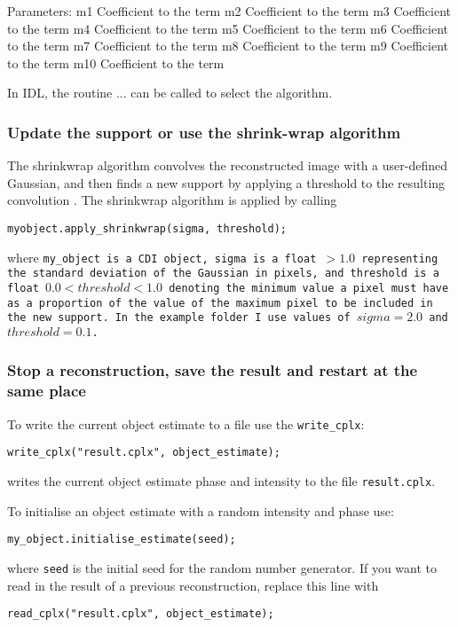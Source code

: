 \documentclass[]{nadia}
\begin{document}
Parameters:
m1 	Coefficient to the  term
m2 	Coefficient to the  term
m3 	Coefficient to the  term
m4 	Coefficient to the  term
m5 	Coefficient to the  term
m6 	Coefficient to the  term
m7 	Coefficient to the  term
m8 	Coefficient to the  term
m9 	Coefficient to the  term
m10 	Coefficient to the  term




In IDL, the routine ... can be called to select the algorithm.


\subsubsection{Update the support or use the shrink-wrap algorithm}

The shrinkwrap algorithm convolves the reconstructed image with a user-defined Gaussian, and then finds a new support by applying a threshold to the resulting convolution \cite{marchesini:03}. The shrinkwrap algorithm is applied by  calling

\begin{verbatim}
myobject.apply_shrinkwrap(sigma, threshold);
\end{verbatim}

where \tt{my\_object} is a CDI object, {\tt sigma} is a float $>1.0$ representing the standard deviation of the Gaussian in pixels, and {\tt threshold} is a float $0.0<threshold<1.0$ denoting the minimum value a pixel must have as a proportion of the value of the maximum pixel to be included in the new support. In the example folder I use values of $sigma = 2.0$ and $threshold = 0.1$. 

\subsubsection{Stop a reconstruction, save the result and restart at the same place}

To write the current object estimate to a file use the {\tt write{\_}cplx}:

\begin{verbatim}
write_cplx("result.cplx", object_estimate);
\end{verbatim}
writes the current object estimate phase and intensity to the file {\tt result.cplx}.

To initialise an object estimate with a random intensity and phase use: 
\begin{verbatim}
my_object.initialise_estimate(seed);
\end{verbatim}
where {\tt seed} is the initial seed for the random number generator. If you want to read in the result of a previous reconstruction, replace this line with 
\begin{verbatim}
read_cplx("result.cplx", object_estimate);
\end{verbatim}
\end{document}
